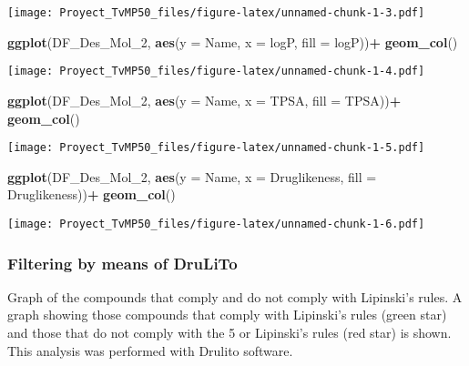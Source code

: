 \documentclass[
]{article}
\newenvironment{Shaded}{\begin{snugshade}}{\end{snugshade}}
\newcommand{\AttributeTok}[1]{\textcolor[rgb]{0.13,0.29,0.53}{#1}}
\newcommand{\FunctionTok}[1]{\textcolor[rgb]{0.13,0.29,0.53}{\textbf{#1}}}
\newcommand{\NormalTok}[1]{#1}
\newcommand{\SpecialCharTok}[1]{\textcolor[rgb]{0.81,0.36,0.00}{\textbf{#1}}}
\begin{document}
\texttt{[image: Proyect\_TvMP50\_files/figure-latex/unnamed-chunk-1-3.pdf]}

\begin{Shaded}
\begin{Highlighting}[]
\FunctionTok{ggplot}\NormalTok{(DF\_Des\_Mol\_2, }\FunctionTok{aes}\NormalTok{(}\AttributeTok{y =}\NormalTok{ Name, }\AttributeTok{x =}\NormalTok{ logP, }\AttributeTok{fill =}\NormalTok{ logP))}\SpecialCharTok{+}
  \FunctionTok{geom\_col}\NormalTok{()}
\end{Highlighting}
\end{Shaded}

\texttt{[image: Proyect\_TvMP50\_files/figure-latex/unnamed-chunk-1-4.pdf]}

\begin{Shaded}
\begin{Highlighting}[]
\FunctionTok{ggplot}\NormalTok{(DF\_Des\_Mol\_2, }\FunctionTok{aes}\NormalTok{(}\AttributeTok{y =}\NormalTok{ Name, }\AttributeTok{x =}\NormalTok{ TPSA, }\AttributeTok{fill =}\NormalTok{  TPSA))}\SpecialCharTok{+}
  \FunctionTok{geom\_col}\NormalTok{()}
\end{Highlighting}
\end{Shaded}

\texttt{[image: Proyect\_TvMP50\_files/figure-latex/unnamed-chunk-1-5.pdf]}

\begin{Shaded}
\begin{Highlighting}[]
\FunctionTok{ggplot}\NormalTok{(DF\_Des\_Mol\_2, }\FunctionTok{aes}\NormalTok{(}\AttributeTok{y =}\NormalTok{ Name, }\AttributeTok{x =}\NormalTok{ Druglikeness, }\AttributeTok{fill =}\NormalTok{ Druglikeness))}\SpecialCharTok{+}
  \FunctionTok{geom\_col}\NormalTok{()}
\end{Highlighting}
\end{Shaded}

\texttt{[image: Proyect\_TvMP50\_files/figure-latex/unnamed-chunk-1-6.pdf]}

\hypertarget{filtering-by-means-of-drulito}{%
\subsubsection{Filtering by means of
DruLiTo}\label{filtering-by-means-of-drulito}}

Graph of the compounds that comply and do not comply with Lipinski's
rules. A graph showing those compounds that comply with Lipinski's rules
(green star) and those that do not comply with the 5 or Lipinski's rules
(red star) is shown. This analysis was performed with Drulito software.
\end{document}
